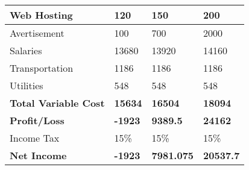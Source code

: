 \begin{table}[!H]
\begin{tabular}{|l|l|l|l|l|}
\multicolumn{2}{|l|}{\cellcolor[HTML]{23BAB3}Web Hosting}                  & 120                                                                   & 150                                                                   & 200                                                                   \\ \hline
\multicolumn{2}{|l|}{\cellcolor[HTML]{23BAB3}Avertisement}                 & 100                                                                   & 700                                                                   & 2000                                                                  \\ \hline
\multicolumn{2}{|l|}{\cellcolor[HTML]{23BAB3}Salaries}                     & 13680                                                                 & 13920                                                                 & 14160                                                                 \\ \hline
\multicolumn{2}{|l|}{\cellcolor[HTML]{23BAB3}Transportation}               & 1186                                                                  & 1186                                                                  & 1186                                                                  \\ \hline
\multicolumn{2}{|l|}{\cellcolor[HTML]{23BAB3}Utilities}                    & 548                                                                   & 548                                                                   & 548                                                                   \\ \hline
\multicolumn{2}{|l|}{\cellcolor[HTML]{23BAB3}\textbf{Total Variable Cost}} & \textbf{15634}                                                        & \textbf{16504}                                                        & \textbf{18094}                                                        \\ \hline
\multicolumn{2}{|l|}{\cellcolor[HTML]{23BAB3}\textbf{Profit/Loss}}         & \textbf{-1923}                                                        & \textbf{9389.5}                                                       & \textbf{24162}                                                        \\ \hline
\multicolumn{2}{|l|}{\cellcolor[HTML]{23BAB3}Income Tax}                   & 15\%                                                                  & 15\%                                                                  & 15\%                                                                  \\ \hline
\multicolumn{2}{|l|}{\cellcolor[HTML]{23BAB3}\textbf{Net Income}}          & \textbf{-1923}                                                        & \textbf{7981.075}                                                     & \textbf{20537.7}                                                      \\ \hline
\end{tabular}
\end{table}
